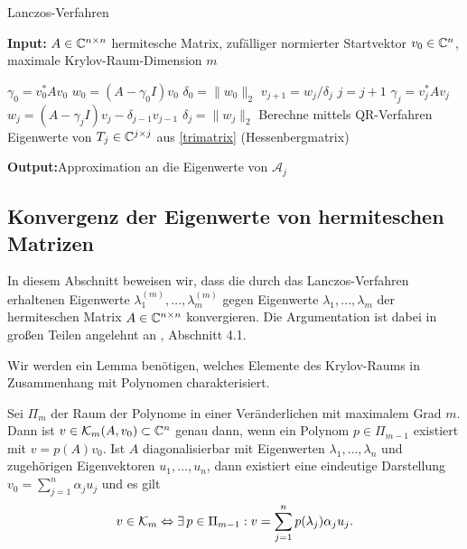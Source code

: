 \documentclass{article}
\begin{document}
\begin{theorem}
\renewcommand{\algorithmicrequire}{\textbf{Input:}}
\renewcommand{\algorithmicensure}{\textbf{Output:}}

\begin{algorithm}
	\label{Lanczos-Verfahren}
	\caption{Lanczos-Verfahren}
	\algorithmicrequire{ $A \in \mathbb{C}^{n\times n}$ hermitesche Matrix, zufälliger normierter Startvektor $v_0 \in \mathbb{C}^n$, maximale Krylov-Raum-Dimension $m$}
	\begin{algorithmic}[1]
		\State $\gamma_0 = v_0^*Av_0$
		\State $w_0 = (A-\gamma_0 I)v_0$
	  \State $\delta_0 = \|w_0\|_2$
		\State $v_{j+1} = w_j/\delta_j$
		\State $j = j+1$
		\State $\gamma_j = v_j^*Av_j$
		\State $w_j = (A-\gamma_j I)v_j - \delta_{j-1}v_{j-1}$
		\State $\delta_j = \|w_j\|_2$
		\EndWhile
		\State Berechne mittels QR-Verfahren Eigenwerte von $T_j \in \mathbb{C}^{j \times j}$ aus \ref{trimatrix} (Hessenbergmatrix)
	\end{algorithmic}
	\algorithmicensure{Approximation an die Eigenwerte von $\mathcal{A}_j$}
\end{algorithm}


\subsection{Konvergenz der Eigenwerte von hermiteschen Matrizen}

In diesem Abschnitt beweisen wir, dass die durch das Lanczos-Verfahren erhaltenen Eigenwerte $\lambda_1^{(m)},\dots,\lambda_m^{(m)}$ gegen Eigenwerte $\lambda_1,\dots,\lambda_m$ der hermiteschen Matrix $A \in \mathbb{C}^{n \times n}$ konvergieren. Die Argumentation ist dabei in großen Teilen angelehnt an \cite{EWPs}, Abschnitt 4.1.

Wir werden ein Lemma benötigen, welches Elemente des Krylov-Raums in Zusammenhang mit Polynomen charakterisiert.

\begin{lemma}
	\label{v0_Polynom_Darstellung}
	Sei $\Pi_m$ der Raum der Polynome in einer Veränderlichen mit maximalem Grad $m$. Dann ist $v \in \mathcal{K}_m(A,v_0) \subset \mathbb{C}^n$ genau dann, wenn ein Polynom $p \in \Pi_{m-1}$ existiert mit $v = p(A)v_0$. \newline
	Ist $A$ diagonalisierbar mit Eigenwerten $\lambda_1, \dots, \lambda_n$ und zugehörigen Eigenvektoren $u_1, \dots, u_n$, dann existiert eine eindeutige Darstellung $v_0 = \sum_{j=1}^{n} \alpha_j u_j$ und es gilt
	\begin{align*}
		v \in \mathcal{K}_m \Leftrightarrow \exists \, p \in \Pi_{m-1}: v = \sum_{j=1}^{n} p(\lambda_j)\alpha_j u_j.
	\end{align*}
\end{lemma}


\end{theorem}
\end{document}
